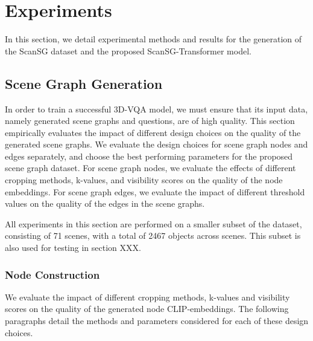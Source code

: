 %
\newpage
\chapter{Experiments}

In this section, we detail experimental methods and results for the generation of the ScanSG dataset and the proposed ScanSG-Transformer model.

\section{Scene Graph Generation}

In order to train a successful 3D-VQA model, we must ensure that its input data, namely generated scene graphs and questions, are of high quality. This section empirically evaluates the impact of different design choices on the quality of the generated scene graphs. We evaluate the design choices for scene graph nodes and edges separately, and choose the best performing parameters for the proposed scene graph dataset. For scene graph nodes, we evaluate the effects of different cropping methods, k-values, and visibility scores on the quality of the node embeddings. For scene graph edges, we evaluate the impact of different threshold values on the quality of the edges in the scene graphs.

All experiments in this section are performed on a smaller subset of the dataset, consisting of 71 scenes, with a total of 2467 objects across scenes. This subset is also used for testing in section XXX.

\subsection{Node Construction}
We evaluate the impact of different cropping methods, k-values and visibility scores on the quality of the generated node CLIP-embeddings. The following paragraphs detail the methods and parameters considered for each of these design choices.

